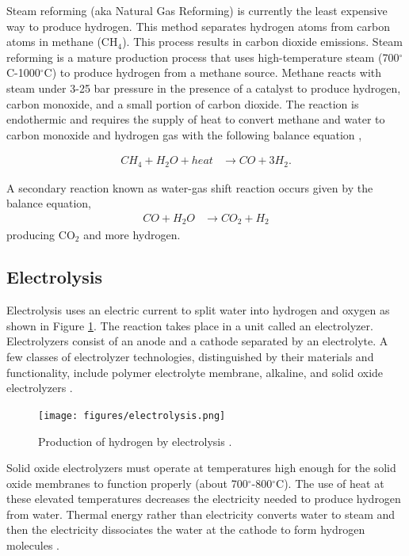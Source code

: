 \documentclass{anstrans}
\begin{document}
Steam reforming (aka Natural Gas Reforming) is currently the least expensive way to produce hydrogen. This method separates hydrogen atoms from carbon atoms in methane (CH$_4$). This process results in carbon dioxide emissions.
Steam reforming is a mature production process that uses high-temperature steam (700$^{\circ}$C-1000$^{\circ}$C) to produce hydrogen from a methane source. Methane reacts with steam under 3-25 bar pressure in the presence of a catalyst to produce hydrogen, carbon monoxide, and a small portion of carbon dioxide.
The reaction is endothermic and requires the supply of heat to convert methane and water to carbon monoxide and hydrogen gas with the following balance equation \cite{doe_office_of_energy_efficiency_and_renewable_energy_hydrogen_2020},

\begin{align}
CH_4 + H_2O + heat & \rightarrow CO + 3H_2 .
\label{eq:1}
\end{align}

A secondary reaction known as water-gas shift reaction occurs given by the balance equation,
\begin{align}
CO + H_2O & \rightarrow CO_2 + H_2
\label{eq:2}
\end{align}
producing CO$_2$ and more hydrogen.

\subsection{Electrolysis}

Electrolysis uses an electric current to split water into hydrogen and oxygen as shown in Figure \ref{fig:electro}. The reaction takes place in a unit called an electrolyzer. Electrolyzers consist of an anode and a cathode separated by an electrolyte.
A few classes of electrolyzer technologies, distinguished by their materials and functionality, include polymer electrolyte membrane, alkaline, and solid oxide electrolyzers \cite{doe_office_of_energy_efficiency_and_renewable_energy_hydrogen_2020}.

\begin{figure}[H]
	\centering
	\texttt{[image: figures/electrolysis.png]}
	\hfill
	\caption{Production of hydrogen by electrolysis \cite{doe_office_of_energy_efficiency_and_renewable_energy_hydrogen_2020}.}
	\label{fig:electro}
\end{figure}

Solid oxide electrolyzers must operate at temperatures high enough for the solid oxide membranes to function properly (about 700$^{\circ}$-800$^{\circ}$C). The use of heat at these elevated temperatures decreases the electricity needed to produce hydrogen from water.
Thermal energy rather than electricity converts water to steam and then the electricity dissociates the water at the cathode to form hydrogen molecules \cite{xu_introduction_2017}.
\end{document}
